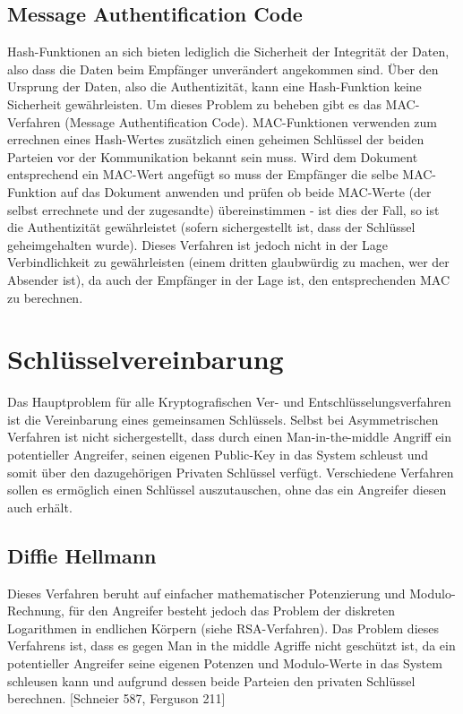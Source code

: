\documentclass[10pt, a4paper,headsepline]{scrreprt}
\begin{document}
\subsection{Message Authentification Code}
Hash-Funktionen an sich bieten lediglich die Sicherheit der Integrität der Daten, also dass die Daten beim Empfänger unverändert angekommen sind. Über den Ursprung der Daten, also die Authentizität, kann eine Hash-Funktion keine Sicherheit gewährleisten. Um dieses Problem zu beheben gibt es das MAC-Verfahren (Message Authentification Code). MAC-Funktionen verwenden zum errechnen eines Hash-Wertes zusätzlich einen geheimen Schlüssel der beiden Parteien vor der Kommunikation bekannt sein muss. Wird dem Dokument entsprechend ein MAC-Wert angefügt so muss der Empfänger die selbe MAC-Funktion auf das Dokument anwenden und prüfen ob beide MAC-Werte (der selbst errechnete und der zugesandte) übereinstimmen - ist dies der Fall, so ist die Authentizität gewährleistet (sofern sichergestellt ist, dass der Schlüssel geheimgehalten wurde). Dieses Verfahren ist jedoch nicht in der Lage Verbindlichkeit zu gewährleisten (einem dritten glaubwürdig zu machen, wer der Absender ist), da auch der Empfänger in der Lage ist, den entsprechenden MAC zu berechnen. 


\section{Schlüsselvereinbarung} 
Das Hauptproblem für alle Kryptografischen Ver- und Entschlüsselungsverfahren ist die Vereinbarung eines gemeinsamen Schlüssels. Selbst bei Asymmetrischen Verfahren ist nicht sichergestellt, dass durch einen Man-in-the-middle Angriff ein potentieller Angreifer, seinen eigenen Public-Key in das System schleust und somit über den dazugehörigen Privaten Schlüssel verfügt. Verschiedene Verfahren sollen es ermöglich einen Schlüssel auszutauschen, ohne das ein Angreifer diesen auch erhält.

\subsection{Diffie Hellmann}
Dieses Verfahren beruht auf einfacher mathematischer Potenzierung und Modulo-Rechnung, für den Angreifer besteht jedoch das Problem der diskreten Logarithmen in endlichen Körpern (siehe RSA-Verfahren). Das Problem dieses Verfahrens ist, dass es gegen Man in the middle Agriffe nicht geschützt ist, da ein potentieller Angreifer seine eigenen Potenzen und Modulo-Werte in das System schleusen kann und aufgrund dessen beide Parteien den privaten Schlüssel berechnen. [Schneier 587, Ferguson 211]
\end{document}

